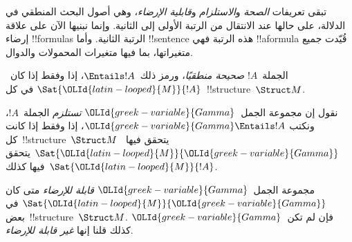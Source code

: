 \documentclass[../../../include/open-logic-section]{subfiles}
\begin{document}

\begin{explain}
تبقى تعريفات \emph{الصحة} و\emph{الاستلزام} و\emph{قابلية الإرضاء}،
وهي أصول البحث المنطقي في الدلالة، على حالها عند الانتقال من الرتبة
الأولى إلى الثانية. وإنما نبنيها الآن على علاقة إرضاء !!{formula}s
الرتبة الثانية. وأما !!{sentence} هذه الرتبة فهي
!!a{formula} قُيّدت جميع متغيراتها، بما فيها متغيرات المحمولات
والدوال.
\end{explain}

\begin{defn}[الصحة]
الجملة~$!A$ \emph{صحيحة منطقيًا}، ورمز ذلك~$\Entails !A$، إذا
وفقط إذا كان~$\Sat{{\OLId{latin-looped}{M}}}{!A}$ في كل~!!{structure}~$\Struct M$.
\end{defn}

\begin{defn}[الاستلزام]
نقول إن مجموعة الجمل~${\OLId{greek-variable}{Gamma}}$ \emph{تستلزم} الجملة~$!A$، ونكتب
${\OLId{greek-variable}{Gamma}} \Entails !A$، إذا وفقط إذا كانت كل~!!{structure}~$\Struct M$
يتحقق فيها~$\Sat{{\OLId{latin-looped}{M}}}{{\OLId{greek-variable}{Gamma}}}$ يتحقق فيها كذلك~$\Sat{{\OLId{latin-looped}{M}}}{!A}$.
\end{defn}

\begin{defn}
مجموعة الجمل~${\OLId{greek-variable}{Gamma}}$ \emph{قابلة للإرضاء} متى كان
$\Sat{{\OLId{latin-looped}{M}}}{{\OLId{greek-variable}{Gamma}}}$ في بعض~!!{structure}~$\Struct M$.
فإن لم تكن~${\OLId{greek-variable}{Gamma}}$ كذلك قلنا إنها \emph{غير قابلة للإرضاء}.
\end{defn}
\end{document}
